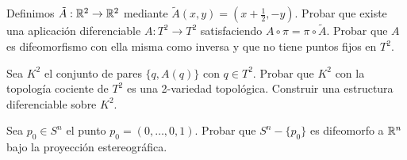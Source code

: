 \documentclass[twoside]{article}
\begin{document}
\newpage

\begin{ejercicio}{8.5}
Definimos $\tilde{A}:\mathbb{R}^2\to\mathbb{R}^2$ mediante $\tilde{A}(x,y)=(x+\frac{1}{2}, -y)$. Probar que existe una aplicación diferenciable $A:T^2\to T^2$ satisfaciendo $A\circ\pi =\pi\circ \tilde{A}$. Probar que $A$ es difeomorfismo con ella misma como inversa y que no tiene puntos fijos en $T^2$. 

Sea $K^2$ el conjunto de pares $\{q,A(q)\}$ con $q\in T^2$. Probar que $K^2$ con la topología cociente de $T^2$ es una 2-variedad topológica. Construir una estructura diferenciable sobre $K^2$.
\end{ejercicio}
\begin{solucion}

\end{solucion}

\newpage

\begin{ejercicio}{8.6}
Sea $p_0\in S^n$  el punto $p_0=(0,\dots, 0,1)$. Probar que $S^n-\{p_0\}$ es difeomorfo a $\mathbb{R}^n$ bajo la proyección estereográfica. 
\end{ejercicio}
\begin{solucion}
\end{solucion}
\end{document}
